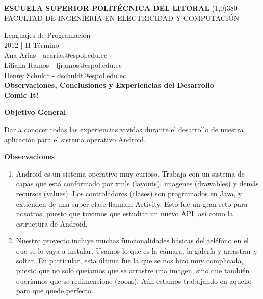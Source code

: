 \documentclass[12pt]{report}
\begin{document}
	\setlength{\topmargin}{-0.5in}
	\pagestyle{empty}
	\begin{center}
		\textbf{
			\vspace{-0.7em}
			ESCUELA SUPERIOR POLITÉCNICA DEL LITORAL
		}
		\line(1,0){380}\\		
		\scriptsize{FACULTAD DE INGENIERÍA EN ELECTRICIDAD Y COMPUTACIÓN}
	\end{center}
	\begin{center}
		\vspace{2.5em}
		Lenguajes de Programación
		\\2012 | II Término
		\vspace{1.5em}
		\\Ana Arias - acarias@espol.edu.ec
		\vspace{0.6mm}
		\\Liliana Ramos - ljramos@espol.edu.ec
		\\Denny Schuldt - dschuldt@espol.edu.ec
		\vspace{3em}
		\large{\textbf{\\ Observaciones, Conclusiones y Experiencias del Desarrollo	\vspace{2em}}}		
	\Huge{\textbf{\\ Comic It!	\vspace{1em}}}
\end{center}
		
\begingroup
		\large{
			\textbf{
				Objetivo General
				\newline
				\newline
			}
		}
	\endgroup

	Dar a conocer todas las experiencias vividas durante el desarrollo de nuestra aplicación para el sistema operativo Android.

	\vspace{4em}

\begingroup
		\large{
			\textbf{
				Observaciones
				\newline
				\newline
			}
		}
	\endgroup

		\begin{enumerate}[a]%
		\item Android es un sistema operativo muy curioso. Trabaja con un sistema de capas que está conformado por xmls (layouts), imagenes (drawables) y demás recursos (values). Los controladores (clases) son programados en Java, y extienden de una super clase llamada Activity.
Esto fue un gran reto para nosotros, puesto que tuvimos que estudiar un nuevo API, así como la estructura de Android.
		\item Nuestro proyecto incluye muchas funcionalidades básicas del teléfono en el que se lo vaya a instalar. Usamos lo que es la cámara, la galería y arrastrar y soltar. En particular, esta última fue la que se nos hizo muy complicada, puesto que no solo queíamos que se arrastre una imagen, sino que también queríamos que se redimensione (zoom). Aún estamos trabajando en aquello para que quede perfecto.
		\end{enumerate}
	
\end{document}

